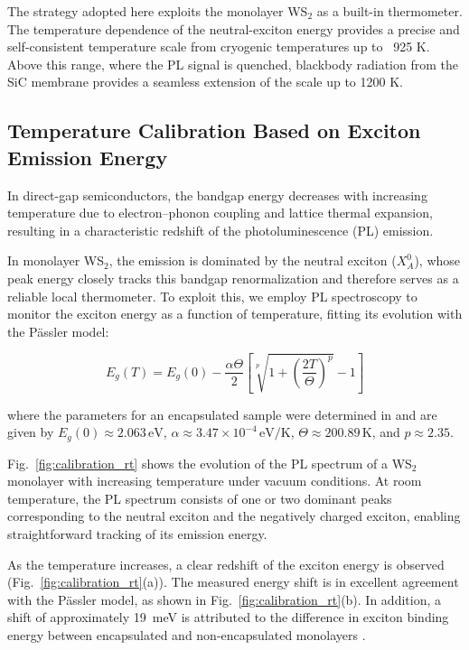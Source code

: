 The strategy adopted here exploits the monolayer WS$_2$ as a built-in thermometer. The temperature dependence of the neutral-exciton energy provides a precise and self-consistent temperature scale from cryogenic temperatures up to ~925 K. Above this range, where the PL signal is quenched, blackbody radiation from the SiC membrane provides a seamless extension of the scale up to 1200 K.

\subsection{Temperature Calibration Based on Exciton Emission Energy}

In direct-gap semiconductors, the bandgap energy decreases with increasing temperature due to electron--phonon coupling and lattice thermal expansion, resulting in a characteristic redshift of the photoluminescence (PL) emission. 

In monolayer WS$_2$, the emission is dominated by the neutral exciton ($X_A^0$), whose peak energy closely tracks this bandgap renormalization and therefore serves as a reliable local thermometer. To exploit this, we employ PL spectroscopy to monitor the exciton energy as a function of temperature, fitting its evolution with the Pässler model:

\begin{equation}
E_g(T) = E_g(0) - \frac{\alpha \Theta}{2}
\left[
\sqrt[p]{1 + \left(\frac{2T}{\Theta}\right)^p} - 1
\right]
\end{equation}

where the parameters for an encapsulated sample were determined in \cite{nagler-2018} and are given by $E_g(0) \approx 2.063\,\mathrm{eV}$, $\alpha \approx 3.47 \times 10^{-4}\,\mathrm{eV/K}$, $\Theta \approx 200.89\,\mathrm{K}$, and $p \approx 2.35$.

Fig.~\ref{fig:calibration_rt} shows the evolution of the PL spectrum of a WS$_2$ monolayer with increasing temperature under vacuum conditions. At room temperature, the PL spectrum consists of one or two dominant peaks corresponding to the neutral exciton and the negatively charged exciton, enabling straightforward tracking of its emission energy.

As the temperature increases, a clear redshift of the exciton energy is observed (Fig.~\ref{fig:calibration_rt}(a)). The measured energy shift is in excellent agreement with the Pässler model, as shown in Fig.~\ref{fig:calibration_rt}(b). In addition, a shift of approximately 19~meV is attributed to the difference in exciton binding energy between encapsulated and non-encapsulated monolayers \cite{raja-2017,cadiz-2017}.


